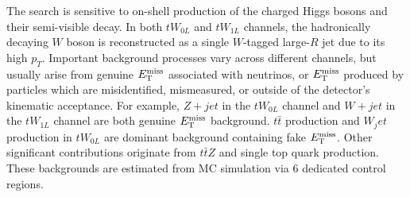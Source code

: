 The search is sensitive to on-shell production of the charged Higgs bosons and their semi-visible decay. In both $tW_{0L}$ and $tW_{1L}$ channels, the hadronically decaying $W$ boson is reconstructed as a single $W$-tagged large-$R$ jet due to its high $p_T$. Important background processes vary across different channels, but usually arise from genuine $E_{\mathrm{T}}^{\mathrm{miss}}$ associated with neutrinos, or $E_{\mathrm{T}}^{\mathrm{miss}}$ produced by particles which are misidentified, mismeasured, or outside of the detector's kinematic acceptance. For example, $Z+jet$ in the $tW_{0L}$ channel and $W+jet$ in the $tW_{1L}$ channel are both genuine $E_{\mathrm{T}}^{\mathrm{miss}}$ background. $t\bar{t}$ production and $W_jet$ production in $tW_{0L}$ are dominant background containing fake $E_{\mathrm{T}}^{\mathrm{miss}}$. Other significant contributions originate from $t\bar{t}Z$ and single top quark production. These backgrounds are estimated from MC simulation via 6 dedicated control regions.

